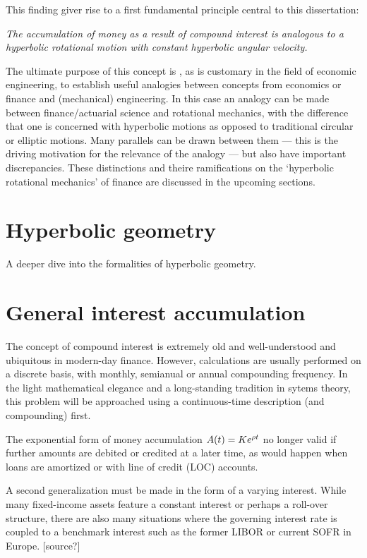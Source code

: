 This finding giver rise to a first fundamental principle central to this dissertation:

\textit{
The accumulation of money as a result of compound interest is analogous to a hyperbolic rotational motion with constant hyperbolic angular velocity.}

The ultimate purpose of this concept is , as is customary in the field of economic engineering, to establish useful analogies between concepts from economics or finance and (mechanical) engineering. In this case an analogy can be made between finance/actuarial science and rotational mechanics, with the difference that one is concerned with hyperbolic motions as opposed to traditional circular or elliptic motions. Many parallels can be drawn between them --- this is the driving motivation for the relevance of the analogy --- but also have important discrepancies. These distinctions and theire ramifications on the `hyperbolic rotational mechanics' of finance are discussed in the upcoming sections.

\section{Hyperbolic geometry}
A deeper dive into the formalities of hyperbolic geometry.

\section{General interest accumulation}
The concept of compound interest is extremely old and well-understood and ubiquitous in modern-day finance. However, calculations are usually performed on a discrete basis, with monthly, semianual or annual compounding frequency. In the light mathematical elegance and a long-standing tradition in sytems theory, this problem will be approached using a continuous-time description (and compounding) first.

The exponential form of money accumulation $A(t) = K e^{\rho t}$ no longer valid if further amounts are debited or credited at a later time, as would happen when loans are amortized or with line of credit (LOC) accounts. 

A second generalization must be made in the form of a varying interest. While many fixed-income assets feature a constant interest or perhaps a roll-over structure, there are also many situations where the governing interest rate is coupled to a benchmark interest such as the former LIBOR or current SOFR in Europe. [source?]

